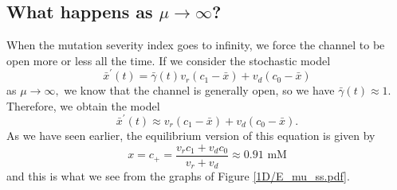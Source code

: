 
\bigskip 
\subsection{What happens as $\mu\longrightarrow \infty$?}
When the mutation severity index goes to infinity, we force the
channel to be open more or less all the time. If we consider the stochastic
model%
\[
\bar{x}^{\prime}(t)=\bar{\gamma}(t)v_{r}(c_{1}-\bar{x})+v_{d}(c_{0}-\bar{x})
\]
as $\mu\longrightarrow\infty,$ we know that the channel is generally
open, so we have $\bar{\gamma}(t)\approx1.$  Therefore, we obtain the model%
\[
\bar{x}^{\prime}(t)\approx v_{r}(c_{1}-\bar{x})+v_{d}(c_{0}-\bar{x}).
\]
As we have seen earlier, the equilibrium version of this equation is given by%
\[
x=c_{+}=\frac{v_{r}c_{1}+v_{d}c_{0}}{v_{r}+v_{d}}\approx0.91\text{ mM}%
\]
and this is what we see from the graphs of Figure \ref{1D/E_mu_ss.pdf}.

